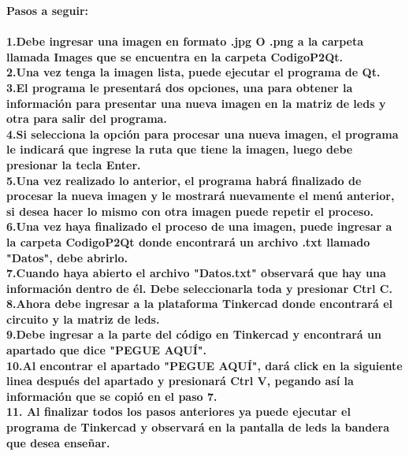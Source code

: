 \documentclass{article}
\begin{document}
\begin{titlepage}
    \Huge
    \textbf{Pasos a seguir:\\\\}
    \large
    \textbf{
    1.Debe ingresar una imagen en formato .jpg O .png a la carpeta llamada Images que se encuentra en la carpeta CodigoP2Qt.\\
    2.Una vez tenga la imagen lista, puede ejecutar el programa de Qt.\\
    3.El programa le presentará dos opciones, una para obtener la información para presentar una nueva imagen en la matriz de leds y otra para salir del programa.\\
    4.Si selecciona la opción para procesar una nueva imagen, el programa le indicará que ingrese la ruta que tiene la imagen, luego debe presionar la tecla Enter.\\
    5.Una vez realizado lo anterior, el programa habrá finalizado de procesar la nueva imagen y le mostrará nuevamente el menú anterior, si desea hacer lo mismo con otra imagen puede repetir el proceso.\\
    6.Una vez haya finalizado el proceso de una imagen, puede ingresar a la carpeta CodigoP2Qt donde encontrará un archivo .txt llamado "Datos", debe abrirlo.\\
    7.Cuando haya abierto el archivo "Datos.txt" observará que hay una información dentro de él. Debe seleccionarla toda y presionar Ctrl C.\\ 
    8.Ahora debe ingresar a la plataforma Tinkercad donde encontrará el circuito y la matriz de leds.\\
    9.Debe ingresar a la parte del código en Tinkercad y encontrará un apartado que dice "PEGUE AQUÍ".\\
    10.Al encontrar el apartado "PEGUE AQUÍ", dará click en la siguiente linea después del apartado y presionará Ctrl V, pegando así la información que se copió en el paso 7.\\
    11. Al finalizar todos los pasos anteriores ya puede ejecutar el programa de Tinkercad y observará en la pantalla de leds la bandera que desea enseñar.\\
    }
    
\end{titlepage}
\end{document}
